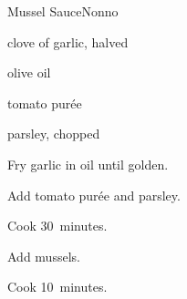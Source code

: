 \begin{recipe}{Mussel Sauce}{Nonno}{}

\begin{ingredients}
\item {}
\item clove of garlic, halved
\item olive oil
\item tomato pur\'ee
\item parsley, chopped
\end{ingredients}

\begin{directions}
\item Fry garlic in oil until golden.
\item Add tomato pur\'ee and parsley.
\item Cook 30~minutes.
\item Add mussels.
\item Cook 10~minutes.
\end{directions}

\end{recipe}
